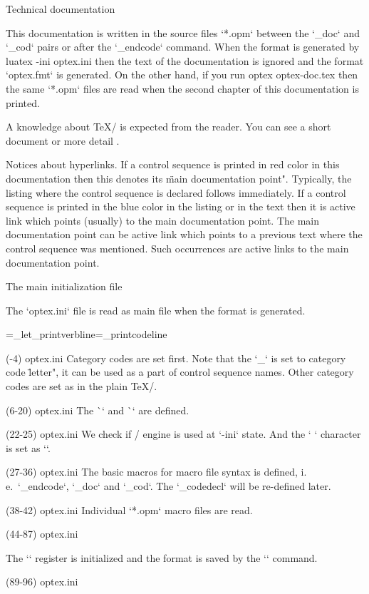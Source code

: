 


\chap Technical documentation

This documentation is written in the source files `*.opm` between
the `\_doc` and `\_cod` pairs or after the `\_endcode` command.
When the format is generated by
\begtt
luatex -ini optex.ini
\endtt
then the text of the documentation is ignored and the format `optex.fmt` is
generated. On the other hand, if you run
\begtt
optex optex-doc.tex
\endtt
then the same `*.opm` files are read when the second chapter of this
documentation is printed.

A knowledge about \TeX/ is expected from the reader. 
You can see a short document 
or more detail
.

Notices about hyperlinks.
If a control sequence is printed in red color in this documentation then
this denotes its \"main documentation point". Typically, the listing where
the control sequence is declared follows immediately. If a control sequence is
printed in the blue color in the listing or in the text 
then it is active link which points (usually) to the main documentation point. 
The main documentation point can be active link which points to a previous 
text where the control sequence was
mentioned. Such occurrences are active links to the main documentation point.

\sec The main initialization file

The `optex.ini` file is read as main file when the format is generated.

{\everytt={\typosize[8/10]\_let\_printverbline=\_printcodeline \medskip}
 \def\docfile{optex.ini}

\verbinput (-4) optex.ini
%
Category codes are set first. Note that the `_` is set to category code
\"letter", it can be used as a part of control sequence names.
Other category codes are set as in the plain \TeX/.

\verbinput (6-20) optex.ini
%
The \`\optexversion` and \`\fmtname` are defined.

\verbinput (22-25) optex.ini
%
We check if \LuaTeX/ engine is used at `-ini` state. And the `^^J` character
is set as `\newlinechar`.

\verbinput (27-36) optex.ini
%
The basic macros for macro file syntax is defined, i.\,e.\ 
`\_endcode`, `\_doc` and `\_cod`. 
The `\_codedecl` will be re-defined later.

\verbinput (38-42) optex.ini
%
Individual `*.opm` macro files are read.

\verbinput (44-87) optex.ini

%
The `\everyjob` register is initialized and the format is saved by 
the `\dump` command.

\verbinput (89-96) optex.ini

}

